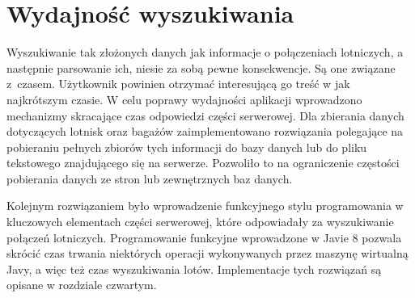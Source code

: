 \documentclass[12pt, twoside]{report}
\begin{document}
\section{Wydajność wyszukiwania}
Wyszukiwanie tak złożonych danych jak informacje o połączeniach lotniczych, a następnie parsowanie ich, niesie za sobą pewne konsekwencje. Są one związane z~czasem. Użytkownik powinien otrzymać interesującą go treść w jak najkrótszym czasie. W celu poprawy wydajności aplikacji wprowadzono mechanizmy skracające czas odpowiedzi części serwerowej.
Dla zbierania danych dotyczących lotnisk oraz bagażów zaimplementowano rozwiązania polegające na pobieraniu pełnych zbiorów tych informacji do bazy danych lub do pliku tekstowego znajdującego się na serwerze. Pozwoliło to na ograniczenie częstości pobierania danych ze stron lub zewnętrznych baz danych.

Kolejnym rozwiązaniem było wprowadzenie funkcyjnego stylu programowania w kluczowych elementach części serwerowej, które odpowiadały za wyszukiwanie połączeń lotniczych.  Programowanie funkcyjne wprowadzone w Javie 8 pozwala skrócić czas trwania niektórych operacji wykonywanych przez maszynę wirtualną Javy, a więc też czas wyszukiwania lotów.
Implementacje tych rozwiązań są opisane w rozdziale czwartym.
\end{document}

